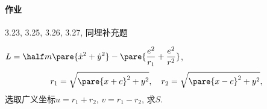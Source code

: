 \documentclass[../LectureNotes.tex]{subfiles}
\begin{document}

\paragraph{作业} %
\label{par:作业}

3.23, 3.25, 3.26, 3.27, 同埋补充题
\begin{ex}
    $\displaystyle L = \half m\pare{\dot{x}^2 + \dot{y}^2} - \pare{\frac{e^2}{r_1} + \frac{e^2}{r^2}}$,
    \[ r_1 = \sqrt{\pare{x+c}^2 + y^2},\quad r_2 = \sqrt{\pare{x-c}^2 + y^2}, \]
    选取广义坐标$u = r_1 + r_2$, $v = r_1 - r_2$, 求$S$.\\
    \centerline{}
\end{ex}

\end{document}
